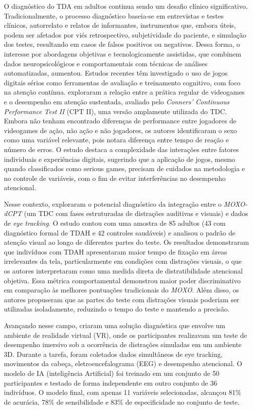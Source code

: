 O diagnóstico do TDA em adultos continua sendo
um desafio clínico significativo. Tradicionalmente, o processo diagnóstico baseia-se em
entrevistas e testes clínicos, autorrelato e relatos de informantes, instrumentos que, embora
úteis, podem ser afetados por viés retrospectivo, subjetividade do paciente, e simulação dos
testes, resultando em casos de falsos positivos ou negativos. Dessa forma, o interesse por
abordagens objetivas e tecnologicamente assistidas, que combinem dados neuropsicológicos
e comportamentais com técnicas de análises automatizadas, aumentou. Estudos recentes
têm investigado o uso de jogos digitais sérios como ferramentas de avaliação e treinamento
cognitivo, com foco na atenção contínua. \textcite{Nascimento2020} exploraram a relação
entre a prática regular de videogames e o desempenho em atenção sustentada, avaliado
pelo \textit{Conners’ Continuous Performance Test II} (CPT II), uma versão amplamente utilizada do
TDC. Embora não tenham encontrado diferenças de
performance entre jogadores de videogames de ação, não ação e não jogadores, os autores
identificaram o sexo como uma variável relevante, pois notara diferença entre tempo de
reação e número de erros. O estudo destaca a complexidade das interações entre fatores
individuais e experiências digitais, sugerindo que a aplicação de jogos, mesmo quando
classificados como serious games, precisam de cuidados na metodologia e no controle de
variáveis, com o fim de evitar interferências no desempenho atencional.

Nesse contexto, \textcite{Elbaum2020} exploraram o potencial diagnóstico da integração
entre o \textit{MOXO-dCPT} (um TDC com fases estruturadas de distrações
auditivas e visuais) e dados de \textit{eye tracking}. O estudo contou com uma
amostra de 85 adultos (43 com diagnóstico formal de TDAH e 42 controles saudáveis) e
analisou o padrão de atenção visual ao longo de diferentes partes do teste. Os resultados
demonstraram que indivíduos com TDAH apresentaram maior tempo de fixação em áreas
irrelevantes da tela, particularmente em condições com distrações visuais, o que os autores
interpretaram como uma medida direta de distratibilidade atencional objetiva. Essa métrica
comportamental demonstrou maior poder discriminativo em comparação às melhores
pontuações tradicionais do \textit{MOXO}. Além disso, os autores propuseram que as partes do teste
com distrações visuais poderiam ser utilizadas isoladamente, reduzindo o tempo do teste e
mantendo a precisão.

Avançando nesse campo, \textcite{Wiebe2024} criaram uma solução diagnóstica que
envolve um ambiente de realidade virtual (VR), onde os participantes realizavam um teste de
desempenho imersivo sob a ocorrência de distrações simuladas em um ambiente 3D.
Durante a tarefa, foram coletados dados simultâneos de eye tracking, movimentos da
cabeça, eletroencefalograma (EEG) e desempenho atencional. O modelo de IA (inteligência Artificial) foi treinado
em um conjunto de 50 participantes e testado de forma independente em outro conjunto de
36 indivíduos. O modelo final, com apenas 11 variáveis selecionadas, alcançou 81\% de
acurácia, 78\% de sensibilidade e 83\% de especificidade no conjunto de teste.

